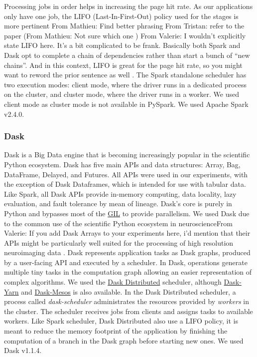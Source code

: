 \documentclass[conference]{IEEEtran}
\newcommand{\TG}[1]{\color{cyan}From Tristan: #1 \color{black}}
\newcommand{\MD}[1]{\color{magenta}From Mathieu: #1 \color{black}}
\newcommand{\VHS}[1]{\color{green}From Valerie: #1 \color{black}}
\begin{document}
Processing jobs in order helps in increasing the page hit rate. As our applications
only have one job, the LIFO (Last-In-First-Out) policy used for the stages is more
pertinent \MD{Find better phrasing} \TG{refer to the paper (\MD{Not sure which one})}
\VHS{I wouldn't explicitly state LIFO here. It's a bit complicated to be frank.
Basically both Spark and Dask opt to complete a chain of dependencies rather than
start a bunch of ``new chains''. And in this context, LIFO is great for the page hit
rate, so you might want to reword the prior sentence as well}. The Spark standalone
scheduler has two execution modes: client mode, where the driver runs in a dedicated
process on the cluster, and cluster mode, where the driver runs in a worker. We used
client mode as cluster mode is not available in PySpark. We used Apache Spark v2.4.0.

\subsubsection{Dask} Dask is a Big Data engine that is becoming increasingly popular
in the scientific Python ecosystem. Dask has five main APIs and data structures:
Array, Bag, DataFrame, Delayed, and Futures. All APIs were used in our experiments,
with the exception of Dask Dataframes, which is intended for use with tabular data.
Like Spark, all Dask APIs provide
in-memory computing, data locality, lazy evaluation, and fault tolerance by mean of
lineage. Dask's core is purely in Python and bypasses most of the
\href{https://docs.python.org/3/glossary.html#term-gil}{GIL} to provide parallelism.
We used Dask due to the common use of the scientific Python ecosystem in
neuroscience\VHS{If you add Dask Arrays to your experiments here, i'd mention that their
APIs might be particularly well suited for the processing of high resolution neuroimaging data}. Dask represents application tasks as Dask graphs, produced by a
user-facing API and executed by a scheduler. In Dask, operations generate multiple
tiny tasks in the computation graph allowing an easier representation of complex
algorithms. We used the \href{https://distributed.dask.org/en/latest/index.html}{Dask
Distributed} scheduler, although \href{https://github.com/dask/dask-yarn}{Dask-Yarn}
and \href{https://github.com/mrocklin/dask-mesos}{Dask-Mesos} is also available. In
the Dask Distributed scheduler, a process called \textit{dask-scheduler}
administrates the resources provided by \textit{workers} in the cluster. The
scheduler receives jobs from clients and assigns tasks to available workers. Like
Spark scheduler, Dask Distributed also use a LIFO policy, it is meant to reduce the
memory footprint of the application by finishing the computation of a branch in the
Dask graph before starting new ones. We used Dask v1.1.4. 
\end{document}
